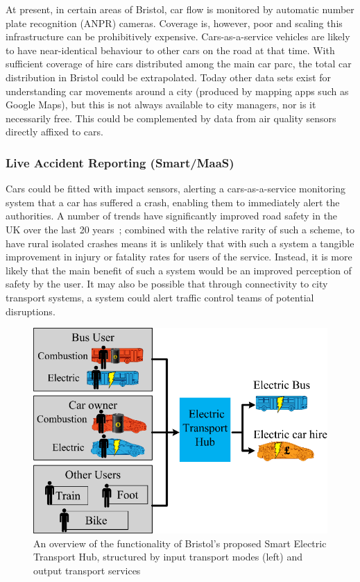 \documentclass[b5paper,10pt]{article}
\begin{document}
At present, in certain areas of Bristol, car flow is monitored by
automatic number plate recognition (ANPR) cameras. Coverage is,
however, poor and scaling this infrastructure can be prohibitively
expensive. Cars-as-a-service vehicles are likely to have
near-identical behaviour to other cars on the road at that time. With
sufficient coverage of hire cars distributed among the main car parc,
the total car distribution in Bristol could be extrapolated. Today
other data sets exist for understanding car movements around a city
(produced by mapping apps such as Google Maps), but this is not always
available to city managers, nor is it necessarily free. This could be
complemented by data from air quality sensors directly affixed to
cars.



\subsubsection{Live Accident Reporting (Smart/MaaS)}

Cars could be fitted with impact sensors, alerting a cars-as-a-service
monitoring system that a car has suffered a crash, enabling them to
immediately alert the authorities. A number of trends have
significantly improved road safety in the UK over the last 20
years~\citep{dftsafetystats:2018}; combined with the relative rarity
of such a scheme, to have rural isolated crashes means it is unlikely
that with such a system a tangible improvement in injury or fatality
rates for users of the service. Instead, it is more likely that the
main benefit of such a system would be an improved perception of
safety by the user. It may also be possible that through connectivity
to city transport systems, a system could alert traffic control teams
of potential disruptions.

\begin{figure}[htb]
\centering
\includegraphics[width=0.75\columnwidth]{images/bristolhub.png}
\caption{An overview of the functionality of Bristol's proposed Smart Electric
  Transport Hub, structured by input transport modes (left) and output
  transport services}
\label{fig:bristolhub}
\end{figure}
\end{document}
